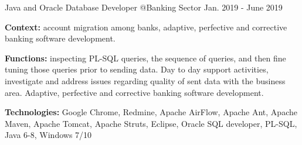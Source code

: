 \begin{cventries}
  \cventry
    {Java and Oracle Database Developer @Banking Sector %
    } %
    {} %
    {} %
    {Jan. 2019 - June 2019} %
    {
      \begin{cvitems} %
		\item[] {\textbf{Context:} account migration among banks, adaptive, perfective and corrective banking software development. 
}
		\item[] {\textbf{Functions:} inspecting PL-SQL queries, the sequence of queries, and then fine tuning those queries prior to sending data. Day to day support activities, investigate and address issues regarding quality of sent data with the business area. Adaptive, perfective and corrective banking software development.}		
		\item[] {\textbf{Technologies:} 
		\textcolor{rainbowcolor-olive}{Google Chrome}, 
		\textcolor{rainbowcolor-olive}{Redmine}, 
		\textcolor{rainbowcolor-olive}{Apache AirFlow}, 
		\textcolor{rainbowcolor-olive}{Apache Ant}, 
		\textcolor{rainbowcolor-olive}{Apache Maven}, 
		\textcolor{rainbowcolor-olive}{Apache Tomcat}, 
		\textcolor{rainbowcolor-olive}{Apache Struts}, 
		\textcolor{rainbowcolor-olive}{Eclipse}, 
		\textcolor{rainbowcolor-olive}{Oracle SQL developer},
		\textcolor{rainbowcolor-indigo}{PL-SQL}, 
		\textcolor{rainbowcolor-indigo}{Java 6-8}, 
		\textcolor{rainbowcolor-orange}{Windows 7/10}}		
      \end{cvitems}
    } 
    

\end{cventries}
